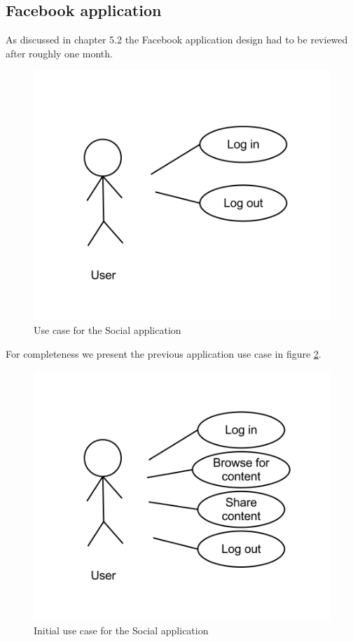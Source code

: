 \subsection{Facebook application}

As discussed in chapter 5.2 the Facebook application design had to be reviewed after roughly one month.

\begin{figure}[h!]
\centering \includegraphics[scale=0.35]{img/design-socialappusecase2}
\caption{Use case for the Social application}
\label{fig:design-socialappusecase2}
\end{figure}

For completeness we present the previous application use case in figure \ref{fig:design-socialappusecase1}.

\begin{figure}[h!]
\centering \includegraphics[scale=0.35]{img/design-socialappusecase1}
\caption{Initial use case for the Social application}
\label{fig:design-socialappusecase1}
\end{figure}


